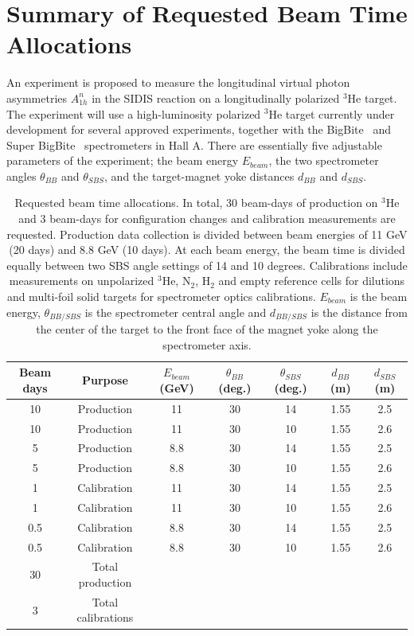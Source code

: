 \section{Summary of Requested Beam Time Allocations}

An experiment is proposed to measure the longitudinal virtual photon asymmetries $A_{1h}^{n}$ in the SIDIS reaction on a longitudinally polarized $^3$He target. The experiment will use a high-luminosity polarized $^3$He target currently under development for several approved experiments, together with the BigBite~\cite{BigBiteOptics1998,BigBite1998,BigBiteOptics2012} and Super BigBite~\cite{SBS_CDR,SBS_CDR_NEW} spectrometers in Hall A. There are essentially five adjustable parameters of the experiment; the beam energy $E_{beam}$, the two spectrometer angles $\theta_{BB}$ and $\theta_{SBS}$, and the target-magnet yoke distances $d_{BB}$ and $d_{SBS}$.
\begin{table}[h]
  \begin{center}
    \caption{\label{Kintable} Requested beam time allocations. In total, 30 beam-days of production on $^3$He and 3 beam-days for configuration changes and calibration measurements are requested. Production data collection is divided between beam energies of 11 GeV (20 days) and 8.8 GeV (10 days). At each beam energy, the beam time is divided equally between two SBS angle settings of 14 and 10 degrees. Calibrations include measurements on unpolarized $^3$He, N$_2$, H$_2$ and empty reference cells for dilutions and multi-foil solid targets for spectrometer optics calibrations. $E_{beam}$ is the beam energy, $\theta_{BB/SBS}$ is the spectrometer central angle and $d_{BB/SBS}$ is the distance from the center of the target to the front face of the magnet yoke along the spectrometer axis.}
    \begin{tabular}{ccccccc}
      \hline \hline Beam days & Purpose & $E_{beam}$ (GeV) & $\theta_{BB}$ (deg.) & $\theta_{SBS}$ (deg.) & $d_{BB}$ (m) & $d_{SBS}$ (m)  \\ \hline 
      10 & Production & 11 & 30 & 14 & 1.55 & 2.5 \\ 
      10 & Production & 11 & 30 & 10 & 1.55 & 2.6 \\
      5 & Production & 8.8 & 30 & 14 & 1.55 & 2.5  \\ 
      5 & Production & 8.8 & 30 & 10 & 1.55 & 2.6  \\
      1 & Calibration & 11 & 30 & 14 & 1.55 & 2.5  \\
      1 & Calibration & 11 & 30 & 10 & 1.55 & 2.6 \\
      0.5 & Calibration & 8.8 & 30 & 14 & 1.55 & 2.5 \\ 
      0.5 & Calibration & 8.8 & 30 & 10 & 1.55 & 2.6  \\ \hline 
      30 & Total production & & & & &  \\ 
      3 & Total calibrations & & & & &  \\ \hline \hline
    \end{tabular}
  \end{center}
\end{table}
